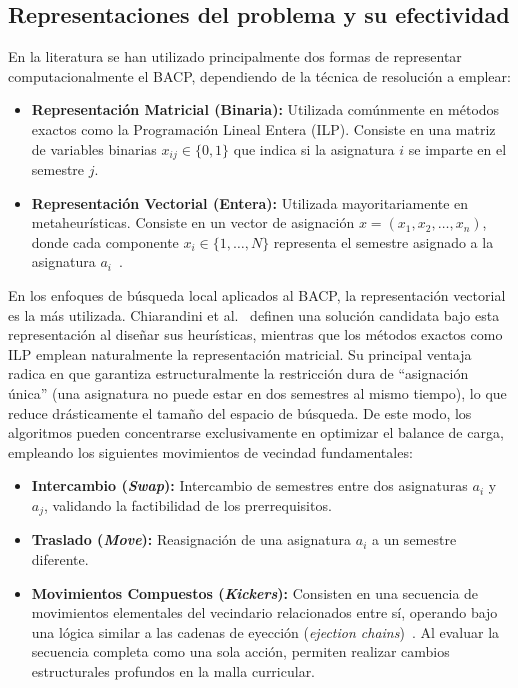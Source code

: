 \documentclass[letter, 10pt]{article}
\begin{document}
\subsection{Representaciones del problema y su efectividad}
En la literatura se han utilizado principalmente dos formas de 
representar computacionalmente el BACP, dependiendo de la 
t\'ecnica de resoluci\'on a emplear:
\begin{itemize}
    \item \textbf{Representaci\'on Matricial (Binaria):} Utilizada 
    com\'unmente en m\'etodos exactos como la Programaci\'on Lineal 
    Entera (ILP). Consiste en una matriz de variables binarias 
    $x_{ij} \in \{0,1\}$ que indica si la asignatura $i$ se imparte 
    en el semestre $j$.
    \item \textbf{Representaci\'on Vectorial (Entera):} Utilizada 
    mayoritariamente en metaheur\'isticas. Consiste en un vector de 
    asignaci\'on $x=(x_1, x_2, \dots, x_n)$, donde cada componente 
    $x_i \in \{1, \dots, N\}$ representa el semestre asignado a la 
    asignatura $a_i$~\cite{Chiarandini2012}.
\end{itemize}
En los enfoques de b\'usqueda local aplicados al BACP, la 
representaci\'on vectorial es la m\'as utilizada. Chiarandini 
et al.~\cite{Chiarandini2012} definen una soluci\'on candidata 
bajo esta representaci\'on al dise\~nar sus heur\'isticas, mientras 
que los m\'etodos exactos como ILP emplean naturalmente la 
representaci\'on matricial. Su principal ventaja radica en que 
garantiza estructuralmente la restricci\'on dura de ``asignaci\'on 
\'unica'' (una asignatura no puede estar en dos semestres al mismo 
tiempo), lo que reduce dr\'asticamente el tama\~no del espacio de 
b\'usqueda. De este modo, los algoritmos pueden concentrarse 
exclusivamente en optimizar el balance de carga, empleando los 
siguientes movimientos de vecindad fundamentales:
\begin{itemize}
    \item \textbf{Intercambio (\textit{Swap}):} Intercambio de 
    semestres entre dos asignaturas $a_{i}$ y $a_{j}$, validando 
    la factibilidad de los prerrequisitos.
    \item \textbf{Traslado (\textit{Move}):} Reasignaci\'on de una 
    asignatura $a_{i}$ a un semestre diferente.
    \item \textbf{Movimientos Compuestos (\textit{Kickers}):} 
    Consisten en una secuencia de movimientos elementales del 
    vecindario relacionados entre s\'i, operando bajo una l\'ogica 
    similar a las cadenas de eyecci\'on (\textit{ejection 
    chains})~\cite{Chiarandini2012}. Al evaluar la secuencia 
    completa como una sola acci\'on, permiten realizar cambios 
    estructurales profundos en la malla curricular.
\end{itemize}
\end{document}
